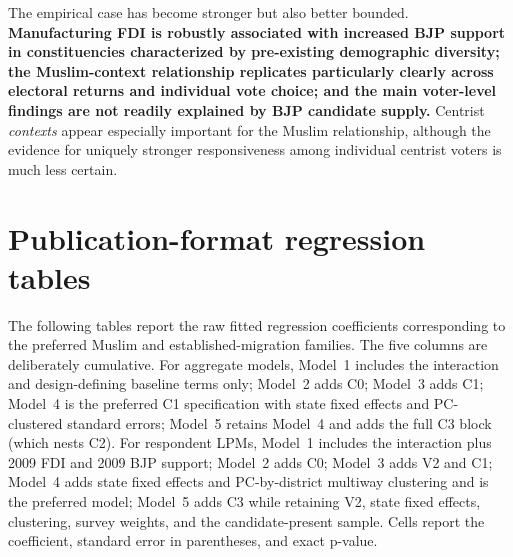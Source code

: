 \documentclass[11pt]{article}
\begin{document}
The empirical case has become stronger but also better bounded. \textbf{Manufacturing FDI is robustly associated with increased BJP support in constituencies characterized by pre-existing demographic diversity; the Muslim-context relationship replicates particularly clearly across electoral returns and individual vote choice; and the main voter-level findings are not readily explained by BJP candidate supply.} Centrist \emph{contexts} appear especially important for the Muslim relationship, although the evidence for uniquely stronger responsiveness among individual centrist voters is much less certain.

\clearpage
\appendix
\section*{Publication-format regression tables}

The following tables report the raw fitted regression coefficients corresponding to the preferred Muslim and established-migration families. The five columns are deliberately cumulative. For aggregate models, Model~1 includes the interaction and design-defining baseline terms only; Model~2 adds C0; Model~3 adds C1; Model~4 is the preferred C1 specification with state fixed effects and PC-clustered standard errors; Model~5 retains Model~4 and adds the full C3 block (which nests C2). For respondent LPMs, Model~1 includes the interaction plus 2009 FDI and 2009 BJP support; Model~2 adds C0; Model~3 adds V2 and C1; Model~4 adds state fixed effects and PC-by-district multiway clustering and is the preferred model; Model~5 adds C3 while retaining V2, state fixed effects, clustering, survey weights, and the candidate-present sample. Cells report the coefficient, standard error in parentheses, and exact p-value.
\end{document}
